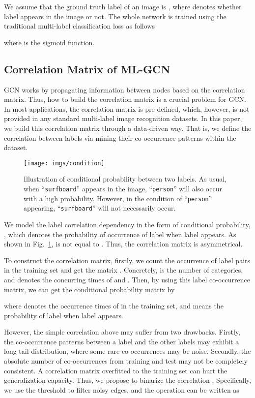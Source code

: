 \documentclass[10pt,twocolumn,letterpaper]{article}
\begin{document}
We assume that the ground truth label of an image is , where  denotes whether label  appears in the image or not. 
The whole network is trained using the traditional multi-label classification loss as follows

where  is the sigmoid function.

\subsection{Correlation Matrix of ML-GCN}\label{sec:cormat}

GCN works by propagating information between nodes based on the correlation matrix. Thus, how to build the correlation matrix  is a crucial problem for GCN. In most applications, the correlation matrix is pre-defined, which, however, is not provided in any standard multi-label image recognition datasets. In this paper, we build this correlation matrix through a data-driven way. That is, we define the correlation between labels via mining their co-occurrence patterns within the dataset. 

\begin{figure}[t!]
	\centering
	\texttt{[image: imgs/condition]}
	\caption{Illustration of conditional probability between two labels. As usual, when ``\texttt{surfboard}'' appears in the image, ``\texttt{person}'' will also occur with a high probability. However, in the condition of ``\texttt{person}'' appearing, ``\texttt{surfboard}'' will not necessarily occur.}
	\label{fig:condition}
\end{figure}



We model the label correlation dependency in the form of conditional probability, \ie,  which denotes the probability of occurrence of label  when label  appears. As shown in Fig.~\ref{fig:condition},  is not equal to . Thus, the correlation matrix is asymmetrical. 

To construct the correlation matrix, firstly, we count the occurrence of label pairs in the training set and get the matrix . Concretely,  is the number of categories, and  denotes the concurring times of  and . Then, by using this label co-occurrence matrix, we can get the conditional probability matrix by 


where  denotes the occurrence times of  in the training set, and  means the probability of label  when label  appears.

However, the simple correlation above may suffer from two drawbacks. Firstly, the co-occurrence patterns between a label and the other labels may exhibit a long-tail distribution, where some rare co-occurrences may be noise. Secondly, the absolute number of co-occurrences from training and test may not be completely consistent. A correlation matrix overfitted to the training set can hurt the generalization capacity. Thus, we propose to binarize the correlation . Specifically, we use the threshold  to filter noisy edges, and the operation can be written as
\end{document}
